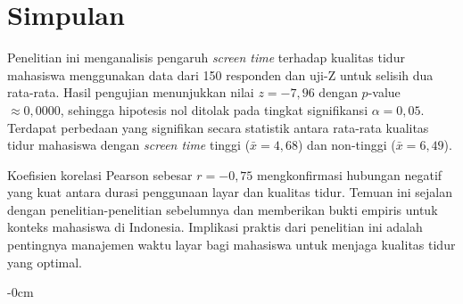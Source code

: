 \documentclass[metlit,article,accept,pdftex,moreauthors]{Definitions/mdpi}
\begin{document}
\section{Simpulan}

Penelitian ini menganalisis pengaruh \textit{screen time} terhadap kualitas tidur mahasiswa menggunakan data dari 150 responden dan uji-Z untuk selisih dua rata-rata. Hasil pengujian menunjukkan nilai $z = -7{,}96$ dengan $p$-value $\approx 0{,}0000$, sehingga hipotesis nol ditolak pada tingkat signifikansi $\alpha = 0{,}05$. Terdapat perbedaan yang signifikan secara statistik antara rata-rata kualitas tidur mahasiswa dengan \textit{screen time} tinggi ($\bar{x} = 4{,}68$) dan non-tinggi ($\bar{x} = 6{,}49$).

Koefisien korelasi Pearson sebesar $r = -0{,}75$ mengkonfirmasi hubungan negatif yang kuat antara durasi penggunaan layar dan kualitas tidur. Temuan ini sejalan dengan penelitian-penelitian sebelumnya \cite{hale2015screen,carter2016association,chang2015evening} dan memberikan bukti empiris untuk konteks mahasiswa di Indonesia. Implikasi praktis dari penelitian ini adalah pentingnya manajemen waktu layar bagi mahasiswa untuk menjaga kualitas tidur yang optimal.

\vspace{6pt} 




\begin{adjustwidth}{-\extralength}{0cm}




\PublishersNote{}
\end{adjustwidth}
\end{document}
